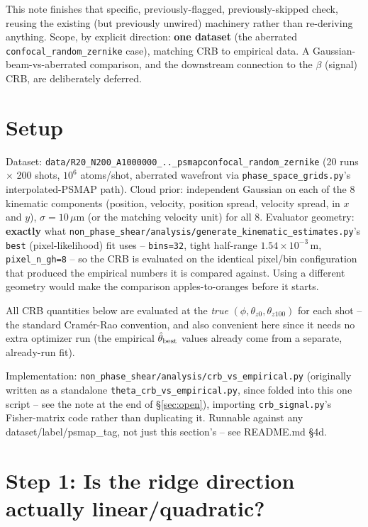 \documentclass[11pt,a4paper]{article}
\newcommand{\code}[1]{\texttt{#1}}
\begin{document}
This note finishes that specific, previously-flagged, previously-skipped
check, reusing the existing (but previously unwired) machinery rather than
re-deriving anything. Scope, by explicit direction: \textbf{one dataset}
(the aberrated \code{confocal\_random\_zernike} case), matching CRB to
empirical data. A Gaussian-beam-vs-aberrated comparison, and the downstream
connection to the $\beta$ (signal) CRB, are deliberately deferred.

\section{Setup}
\label{sec:setup}

Dataset: \code{data/R20\_N200\_A1000000\_..\_psmapconfocal\_random\_zernike}
(20 runs $\times$ 200 shots, $10^6$ atoms/shot, aberrated wavefront via
\code{phase\_space\_grids.py}'s interpolated-PSMAP path). Cloud prior:
independent Gaussian on each of the 8 kinematic components (position,
velocity, position spread, velocity spread, in $x$ and $y$), $\sigma=10\,\mu$m
(or the matching velocity unit) for all 8. Evaluator geometry:
\textbf{exactly} what \code{non\_phase\_shear/analysis/generate\_kinematic\_estimates.py}'s
\code{best} (pixel-likelihood) fit uses -- \code{bins=32}, tight half-range
$1.54\times10^{-3}$\,m, \code{pixel\_n\_gh=8} -- so the CRB is evaluated on
the identical pixel/bin configuration that produced the empirical numbers it
is compared against. Using a different geometry would make the comparison
apples-to-oranges before it starts.

All CRB quantities below are evaluated at the \emph{true} $(\phi,\theta_{z0},
\theta_{z100})$ for each shot -- the standard Cram\'er-Rao convention, and
also convenient here since it needs no extra optimizer run (the empirical
$\hat\theta_{\rm best}$ values already come from a separate, already-run
fit).

Implementation: \code{non\_phase\_shear/analysis/crb\_vs\_empirical.py}
(originally written as a standalone \code{theta\_crb\_vs\_empirical.py},
since folded into this one script -- see the note at the end of
\S\ref{sec:open}), importing \code{crb\_signal.py}'s Fisher-matrix code
rather than duplicating it. Runnable against any dataset/label/psmap\_tag,
not just this section's -- see README.md \S4d.

\section{Step 1: Is the ridge direction actually linear/quadratic?}
\label{sec:ridge}
\end{document}
